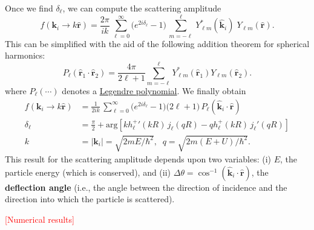 \documentclass[pra,12pt]{revtex4}
\begin{document}
Once we find $\delta_\ell$, we can compute the scattering amplitude
$$f(\mathbf{k}_i\rightarrow k\hat{\mathbf{r}}) = \frac{2 \pi}{ik}\, \sum_{\ell =0}^\infty \big(e^{2i\delta_\ell} - 1\big) \, \sum_{m=-\ell}^\ell \,Y_{\ell m}^*(\hat{\mathbf{k}}_i)\; Y_{\ell m}(\hat{\mathbf{r}}).$$
This can be simplified with the aid of the following addition theorem
for spherical harmonics:
$$P_\ell(\hat{\mathbf{r}}_1\cdot\hat{\mathbf{r}}_2) = \frac{4\pi}{2\ell+1} \sum_{m=-\ell}^{\ell} Y_{\ell m}^*(\hat{\mathbf{r}}_1) Y_{\ell m}(\hat{\mathbf{r}}_2).$$
where $P_\ell(\cdots)$ denotes a
\href{https://en.wikipedia.org/wiki/Legendre_polynomials}{Legendre
  polynomial}.  We finally obtain
$$\boxed{\quad\begin{aligned}f(\mathbf{k}_i \rightarrow k\hat{\mathbf{r}}) &= \frac{1}{2ik}\, \sum_{\ell =0}^\infty \big(e^{2i\delta_\ell} - 1\big) \big(2\ell+1\big)\, P_{\ell}(\hat{\mathbf{k}}_i\cdot \hat{\mathbf{r}}) \\ \delta_\ell &= \frac{\pi}{2} + \mathrm{arg}\!\left[k{h_\ell^+}'(kR) \, j_\ell(qR) - qh_\ell^+(kR)\, j_\ell'(qR)\right] \\ k &= |\mathbf{k}_i| = \sqrt{2mE/\hbar^2}, \;\; q = \sqrt{2m(E+U)/\hbar^2}.\end{aligned}\quad}$$
This result for the scattering amplitude depends upon two variables:
(i) $E$, the particle energy (which is conserved), and (ii) $\Delta
\theta = \cos^{-1}(\hat{\mathbf{k}}_i\cdot \hat{\mathbf{r}})$, the
\textbf{deflection angle} (i.e., the angle between the direction of
incidence and the direction into which the particle is scattered).



\textcolor{red}{[Numerical results]}
\end{document}
